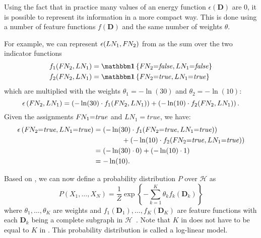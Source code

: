 \bigskip

Using the fact that in practice many values of an \gls{energy function} $\epsilon(\mathbf{D})$ are $0$, it is possible to represent its information in a more compact way.
This is done using a number of \glspl{feature function} $f(\mathbf{D})$ and the same number of weights $\theta$.

For example, we can represent $\epsilon(LN_1,F\hspace{-0.07em} N_2)$ from  as the sum over the two indicator functions
\begin{equation*}
  \begin{split}
    f_1(F\rs N_2,LN_1)&=\identityfun\left\{F\rs N_2{=}\mathit{false},LN_1{=}\mathit{false}\right\}\\
    f_2(F\rs N_2,LN_1)&=\identityfun\left\{F\rs N_2{=}\mathit{true},LN_1{=}\mathit{true}\right\}
  \end{split}
\end{equation*}
which are multiplied with the weights $\theta_1{=}-\ln(30)$ and $\theta_2{=}-\ln(10)$:
\begin{equation*}
  \epsilon\left(F\hspace{-0.07em} N_2,LN_1\right)=\left(-\ln(30)\cdot f_1(F\hspace{-0.07em} N_2,LN_1)\right)+\left(-\ln(10)\cdot f_2(F\hspace{-0.07em} N_2,LN_1)\right).
\end{equation*}
Given the assignments $F\hspace{-0.07em} N_1{=}\mathit{true}$ and $LN_1{=}\mathit{true}$, we have:
\begin{equation*}
  \begin{split}
  \epsilon\left(F\hspace{-0.07em} N_2{=}\mathit{true},LN_1{=}\mathit{true}\right)&=\left(-\ln(30)\cdot f_1(F\hspace{-0.07em} N_2{=}\mathit{true},LN_1{=}\mathit{true})\right)\\
  &\hspace{4em}+\left(-\ln(10)\cdot f_2(F\hspace{-0.07em} N_2{=}\mathit{true},LN_1{=}\mathit{true})\right)\\
  &=\left(-\ln(30)\cdot 0\right)+\left(-\ln(10)\cdot 1\right)\\
  &=-\ln(10).
  \end{split}
\end{equation*}

\bigskip

Based on , we can now define a \gls{probability distribution} $P$ over $\mathcal{H}$ as
\begin{equation}
  \label{equ:log-linear-model}
  P\left(X_1,\dots,X_N\right) = \frac{1}{Z}\exp\left\{-\sum_{k=1}^K \theta_k f_k\left(\mathbf{D}_k\right)\right\}
\end{equation}
where $\theta_1,\dots,\theta_K$ are weights and $f_1(\mathbf{D}_1),\dots,f_K(\mathbf{D}_K)$ are \glspl{feature function} with each $\mathbf{D}_k$ being a complete subgraph in $\mathcal{H}$~\citep{koller2009probabilistic}.
Note that $K$ in  does not have to be equal to $K$ in .
This \gls{probability distribution} is called a \gls{log-linear model}.

